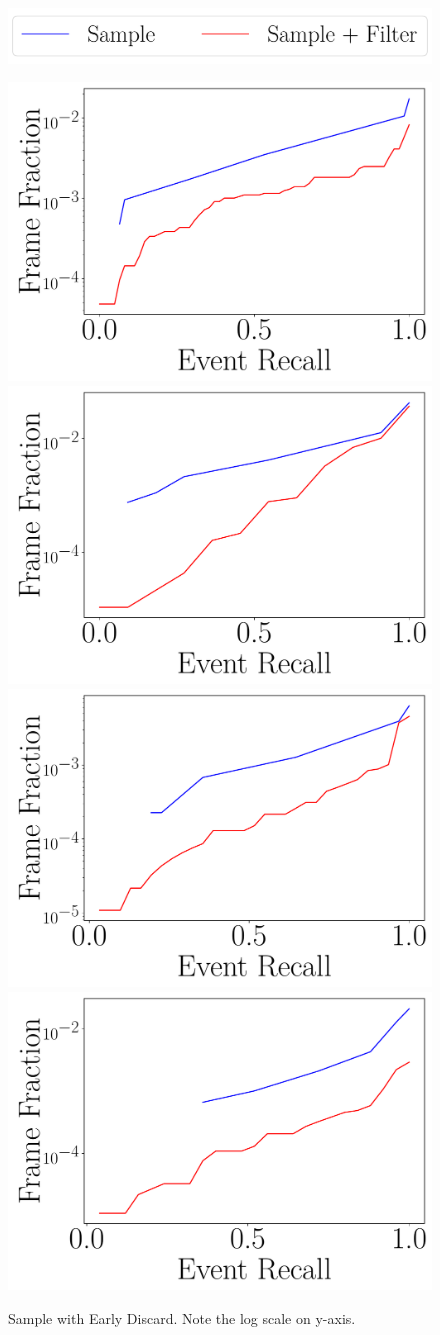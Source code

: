 \begin{figure}[h]
    \centering
    \includegraphics[width=0.7\linewidth]{FIGS/fig-recall-frame-aggregated-legend.pdf}

    \includegraphics[trim={0.5cm 0.5cm 0 0},clip,width=0.47\linewidth]{FIGS/fig-random-select-and-filter-recall-frame-okutama-aggregated.pdf}
    \includegraphics[trim={0.5cm 0.5cm 0
      0},clip,width=0.47\linewidth]{FIGS/fig-random-select-and-filter-recall-frame-stanford-aggregated.pdf}
    \includegraphics[trim={0.5cm 0.5cm 0 0},clip,width=0.47\linewidth]{FIGS/fig-random-select-and-filter-recall-frame-raft-aggregated.pdf}
    \includegraphics[trim={0.5cm 0.5cm 0 0},clip,width=0.47\linewidth]{FIGS/fig-random-select-and-filter-recall-frame-elephant-aggregated.pdf}
\caption{Sample with Early Discard. Note the log scale on y-axis.}
\label{fig:sampling-discard}
\end{figure}

